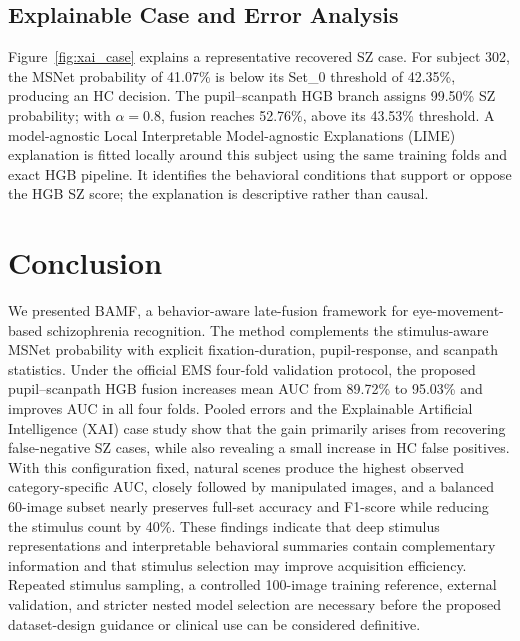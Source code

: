 \documentclass[conference,a4paper]{IEEEtran}
\begin{document}
\subsection{Explainable Case and Error Analysis}
Figure~\ref{fig:xai_case} explains a representative recovered SZ case. For subject 302, the MSNet probability of 41.07\% is below its Set\_0 threshold of 42.35\%, producing an HC decision. The pupil--scanpath HGB branch assigns 99.50\% SZ probability; with $\alpha=0.8$, fusion reaches 52.76\%, above its 43.53\% threshold. A model-agnostic Local Interpretable Model-agnostic Explanations (LIME) explanation is fitted locally around this subject using the same training folds and exact HGB pipeline. It identifies the behavioral conditions that support or oppose the HGB SZ score; the explanation is descriptive rather than causal.

\section{Conclusion}
We presented BAMF, a behavior-aware late-fusion framework for eye-movement-based schizophrenia recognition. The method complements the stimulus-aware MSNet probability with explicit fixation-duration, pupil-response, and scanpath statistics. Under the official EMS four-fold validation protocol, the proposed pupil--scanpath HGB fusion increases mean AUC from 89.72\% to 95.03\% and improves AUC in all four folds. Pooled errors and the Explainable Artificial Intelligence (XAI) case study show that the gain primarily arises from recovering false-negative SZ cases, while also revealing a small increase in HC false positives. With this configuration fixed, natural scenes produce the highest observed category-specific AUC, closely followed by manipulated images, and a balanced 60-image subset nearly preserves full-set accuracy and F1-score while reducing the stimulus count by 40\%. These findings indicate that deep stimulus representations and interpretable behavioral summaries contain complementary information and that stimulus selection may improve acquisition efficiency. Repeated stimulus sampling, a controlled 100-image training reference, external validation, and stricter nested model selection are necessary before the proposed dataset-design guidance or clinical use can be considered definitive.



\end{document}
